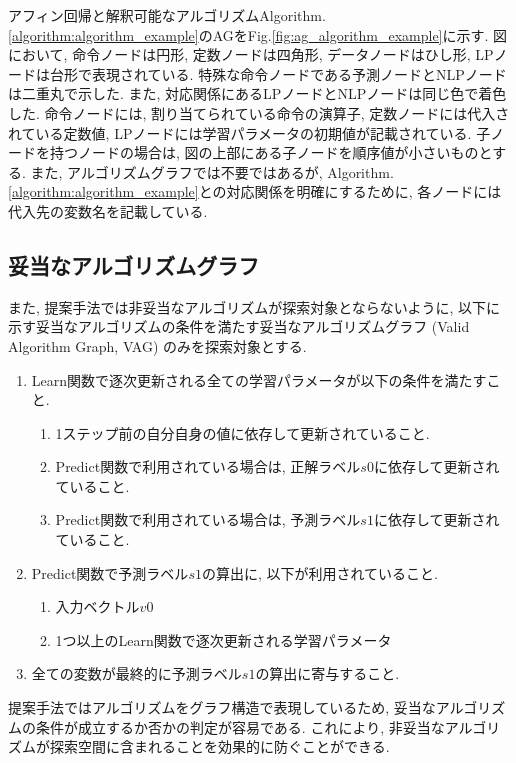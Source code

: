 \documentclass[a4paper,11pt,twocolumn]{jarticle}
\begin{document}
アフィン回帰と解釈可能なアルゴリズムAlgorithm.\ref{algorithm:algorithm_example}のAGをFig.\ref{fig:ag_algorithm_example}に示す. 図において, 命令ノードは円形, 定数ノードは四角形, データノードはひし形, LPノードは台形で表現されている. 特殊な命令ノードである予測ノードとNLPノードは二重丸で示した. また, 対応関係にあるLPノードとNLPノードは同じ色で着色した. 命令ノードには, 割り当てられている命令の演算子, 定数ノードには代入されている定数値, LPノードには学習パラメータの初期値が記載されている. 子ノードを持つノードの場合は, 図の上部にある子ノードを順序値が小さいものとする. また, アルゴリズムグラフでは不要ではあるが, Algorithm.\ref{algorithm:algorithm_example}との対応関係を明確にするために, 各ノードには代入先の変数名を記載している.

\subsection{妥当なアルゴリズムグラフ}
また, 提案手法では非妥当なアルゴリズムが探索対象とならないように, 以下に示す妥当なアルゴリズムの条件を満たす妥当なアルゴリズムグラフ (Valid Algorithm Graph, VAG) のみを探索対象とする.
\begin{enumerate}
  \item Learn関数で逐次更新される全ての学習パラメータが以下の条件を満たすこと.
  \begin{enumerate}
    \item 1ステップ前の自分自身の値に依存して更新されていること.
    \item Predict関数で利用されている場合は, 正解ラベル$s0$に依存して更新されていること.
    \item Predict関数で利用されている場合は, 予測ラベル$s1$に依存して更新されていること.
  \end{enumerate}
  \item Predict関数で予測ラベル$s1$の算出に, 以下が利用されていること.
  \begin{enumerate}
    \item 入力ベクトル$v0$
    \item 1つ以上のLearn関数で逐次更新される学習パラメータ
  \end{enumerate}
  \item 全ての変数が最終的に予測ラベル$s1$の算出に寄与すること.
\end{enumerate}
\noindent
提案手法ではアルゴリズムをグラフ構造で表現しているため, 妥当なアルゴリズムの条件が成立するか否かの判定が容易である. これにより, 非妥当なアルゴリズムが探索空間に含まれることを効果的に防ぐことができる.
\end{document}
